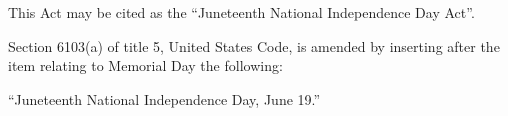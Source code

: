 \documentclass{bill-usa}
\begin{document}
\begin{bill}

This Act may be cited as the “Juneteenth National Independence Day Act”.


Section 6103(a) of title 5, United States Code, is amended by inserting after the item relating to Memorial Day the following:


\hspace{0.25in}``Juneteenth National Independence Day, June 19.''


\end{bill}
\end{document}
